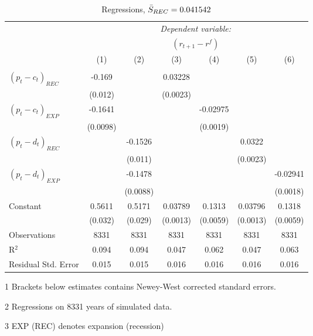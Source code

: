 \begin{table}[H]
\centering   
  \caption{Regressions, $\Bar{S}_{REC} = 0.041542$}           
  \label{tab:regress1}  
  \begin{adjustbox}{max width=\textwidth}
  \begin{threeparttable}
\begin{tabular}{@{\hspace{5pt}}l@{\hspace{5pt}}cccccc} 
\toprule 
 & \multicolumn{6}{c}{\textit{Dependent variable:}} \\ 
 & \multicolumn{6}{c}{$\left(r_{t+1}-r^f\right)$} \\ 
 \cmidrule(rr){2-7}
 & (1) & (2) & (3) & (4) & (5) & (6) \\ 
\midrule  
\\[-2.1ex] $\left( p_t - c_t \right)_{REC}$ &-0.169& &0.03228 & & &\\ 
  & (0.012) & &(0.0023) & & & \\ 
 \addlinespace 
  $\left( p_t - c_t \right)_{EXP}$ &-0.1641  &    & &-0.02975 & &  \\ 
  & (0.0098) & & &(0.0019) & & \\ 
 \addlinespace 
  $\left( p_t - d_t \right)_{REC}$ & &-0.1526& & & 0.0322  &   \\ 
                                   & &  (0.011) & & & (0.0023) &    \\ 
 \addlinespace 
  $\left( p_t - d_t \right)_{EXP}$ & &   -0.1478& & & &-0.02941 \\ 
                                   & &  (0.0088) & & & &(0.0018) \\ 
 \addlinespace 
 Constant &0.5611 &0.5171&0.03789 &0.1313 &0.03796 &0.1318 \\ 
          &(0.032) &(0.029)&(0.0013)&(0.0059)&(0.0013)&(0.0059) \\ 
 \addlinespace 
\midrule  
Observations & 8331 & 8331&8331 & 8331&8331&8331\\
R$^{2}$ &0.094 & 0.094&0.047&0.062&0.047&0.063 \\ 
Residual Std. Error &0.015 & 0.015&0.016&0.016&0.016&0.016 \\ 
\bottomrule 
\end{tabular} 
\begin{tablenotes}
\footnotesize{
\item[1] Brackets below estimates contains Newey-West corrected standard errors. 
\item[2] Regressions on 8331 years of simulated data.
\item[3] EXP (REC) denotes expansion (recession)
}
\end{tablenotes}
\end{threeparttable}
\end{adjustbox}
\end{table} 
